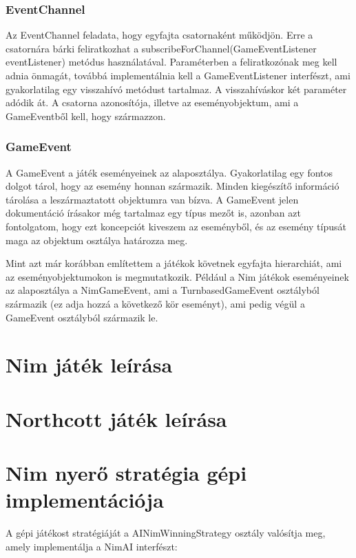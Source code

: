 \subsubsection{EventChannel}
Az EventChannel feladata, hogy egyfajta csatornaként működjön. Erre a csatornára bárki feliratkozhat a subscribeForChannel(GameEventListener eventListener) metódus használatával. Paraméterben a feliratkozónak meg kell adnia önmagát, továbbá implementálnia kell a GameEventListener interfészt, ami gyakorlatilag egy visszahívó metódust tartalmaz. A visszahíváskor két paraméter adódik át. A csatorna azonosítója, illetve az eseményobjektum, ami a GameEventből kell, hogy származzon.

\subsubsection{GameEvent}
A GameEvent a játék eseményeinek az alaposztálya. Gyakorlatilag egy fontos dolgot tárol, hogy az esemény honnan származik. Minden kiegészítő információ tárolása a leszármaztatott objektumra van bízva. A GameEvent jelen dokumentáció írásakor még tartalmaz egy típus mezőt is, azonban azt fontolgatom, hogy ezt koncepciót kiveszem az eseményből, és az esemény típusát maga az objektum osztálya határozza meg.\ujsor

Mint azt már korábban említettem a játékok követnek egyfajta hierarchiát, ami az eseményobjektumokon is megmutatkozik. Például a Nim játékok eseményeinek az alaposztálya a NimGameEvent, ami a TurnbasedGameEvent osztályból származik (ez adja hozzá a következő kör eseményt), ami pedig végül a GameEvent osztályból származik le.

\section{Nim játék leírása}

\section{Northcott játék leírása}


\section{Nim nyerő stratégia gépi implementációja}
A gépi játékost stratégiáját a AINimWinningStrategy osztály valósítja meg, amely implementálja a NimAI interfészt:



